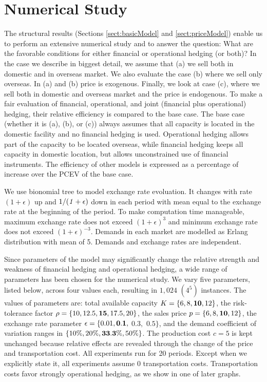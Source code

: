 \documentclass[mnsc,nonblindrev,copyedit]{informs2_wz} %
\begin{document}
\section{Numerical Study \label{sect:numer}}

The structural results (Sections \ref{sect:basicModel} and \ref{sect:priceModel}) enable us to perform an extensive numerical study and to answer the question: What are the favorable conditions for either financial or operational hedging (or both)?  In the case we describe in biggest detail, we assume that (a) we sell both in domestic and in overseas market.  We also evaluate the case (b) where we sell only overseas.  In (a) and (b) price is exogenous.  Finally, we look at case (c), where we sell both in domestic and overseas market and the price is endogenous.  To make a fair evaluation of financial, operational, and joint (financial plus operational) hedging, their relative efficiency is compared to the base case.  The base case (whether it is (a), (b), or (c)) always assumes that all capacity is located in the domestic facility and no financial hedging is used.  Operational hedging allows part of the capacity to be located overseas, while financial hedging keeps all capacity in domestic location, but allows unconstrained use of financial instruments.  The efficiency of other models is expressed as a percentage of increase over the PCEV of the base case.  

We use bionomial tree to model exchange rate evoluation.  It changes with rate {\it $(1+\epsilon)$} up and $1/{\it (1+\epsilon)}$ down in each period with mean equal to the exchange rate at the beginning of the period.  To make computation time manageable, maximum exchange rate does not exceed $(1+\epsilon)^3$ and minimum exchange rate does not exceed $(1+\epsilon)^{-3}$.  Demands in each market are modelled as Erlang distribution with mean of 5.  Demands and exchange rates are independent. 

Since parameters of the model may significantly change the relative strength and weakness of financial hedging and operational hedging, a wide range of parameters has been chosen for the numerical study. We vary five parameters, listed below, across four values each, resulting in $1,024$ $(4^5)$ instances.  The values of parameters are: total available capacity $K= \{6, 8, \bold{10}, 12\}$, the risk-tolerance factor $\rho = \{10, 12.5, \bold{15}, 17.5, 20\}$, the sales price $p = \{6, 8, \bold{10}, 12\}$, the exchange rate parameter $\epsilon=\{0.01, \bold{0.1},$ $0.3,$ $0.5 \}$, and the demand coefficient of variation ranges in $\{10\%, 20\%, \bold{33.3\%}, 50\%\}$.  The production cost $c=5$ is kept unchanged because relative effects are revealed through the change of the price and transportation cost. All experiments run for 20 periods.  Except when we explicitly state it, all experiments assume 0 transportation costs.  Transportation costs favor strongly operational hedging, as we show in one of later graphs.
\end{document}
